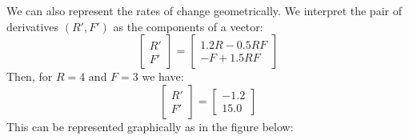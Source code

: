 \documentclass{ximera}
\begin{document}
We can also represent the rates of change geometrically. We interpret the pair of derivatives $(R',F')$ as the components of a vector:
\[
\begin{bmatrix}R'\\F'\end{bmatrix}=
\begin{bmatrix}1.2R-0.5RF\\-F+1.5RF\end{bmatrix}
\]
Then, for $R=4$ and $F=3$ we have:
\[
\begin{bmatrix}R'\\F'\end{bmatrix}=
\begin{bmatrix}-1.2\\15.0\end{bmatrix}
\]
This can be represented graphically as in the figure below:
\begin{center}
\end{center}
\end{document}
